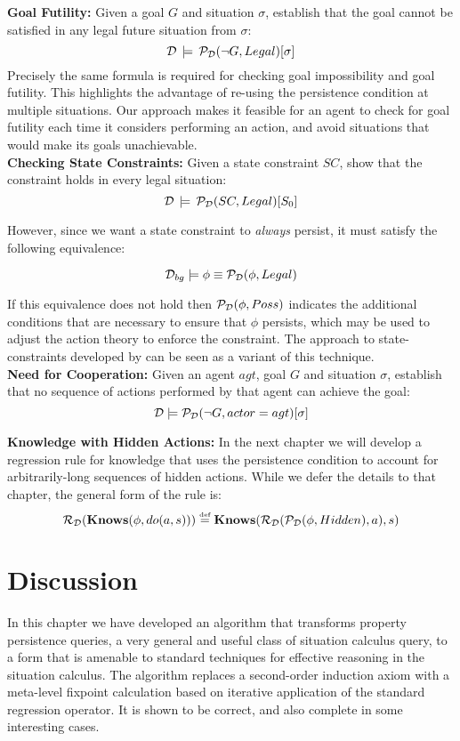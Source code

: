\textbf{Goal Futility:} Given a goal $G$ and situation $\sigma$,
establish that the goal cannot be satisfied in any legal future situation
from $\sigma$:\[
\mathcal{D}\,\models\,\mathcal{P}_{\mathcal{D}}(\neg G,Legal)[\sigma]\]
 Precisely the same formula is required for checking goal impossibility
and goal futility. This highlights the advantage of re-using the persistence
condition at multiple situations. Our approach makes it feasible for
an agent to check for goal futility each time it considers performing
an action, and avoid situations that would make its goals unachievable.\\


\textbf{Checking State Constraints:} Given a state constraint $SC$,
show that the constraint holds in every legal situation:\[
\mathcal{D}\,\models\,\mathcal{P}_{\mathcal{D}}(SC,Legal)[S_{0}]\]


However, since we want a state constraint to \emph{always} persist,
it must satisfy the following equivalence:

\[
\mathcal{D}_{bg}\models\phi\equiv\mathcal{P}_{\mathcal{D}}(\phi,Legal)\]


If this equivalence does not hold then $\mathcal{P}_{\mathcal{D}}(\phi,Poss)$ indicates
the additional conditions that are necessary to ensure that $\phi$
persists, which may be used to adjust the action theory to enforce
the constraint. The approach to state-constraints developed by \citet{Lin94-StateConstraints}
can be seen as a variant of this technique.\\


\textbf{Need for Cooperation:} Given an agent $agt$, goal $G$ and
situation $\sigma$, establish that no sequence of actions performed
by that agent can achieve the goal:\[
\mathcal{D}\models\mathcal{P}_{\mathcal{D}}(\neg G,actor=agt)[\sigma]\]


\textbf{Knowledge with Hidden Actions:} In the next chapter we will
develop a regression rule for knowledge that uses the persistence
condition to account for arbitrarily-long sequences of hidden actions.
While we defer the details to that chapter, the general form of the
rule is:\[
\mathcal{R}_{\mathcal{D}}(\mathbf{Knows}(\phi,do(a,s)))\stackrel{\mbox{\tiny def}}{=}\mathbf{Knows}(\mathcal{R}_{\mathcal{D}}(\mathcal{P}_{\mathcal{D}}(\phi,Hidden),a),s)\]



\section{Discussion\label{sec:Persistence:Discussion}}

In this chapter we have developed an algorithm that transforms property
persistence queries, a very general and useful class of situation
calculus query, to a form that is amenable to standard techniques
for effective reasoning in the situation calculus. The algorithm replaces
a second-order induction axiom with a meta-level fixpoint calculation
based on iterative application of the standard regression operator.
It is shown to be correct, and also complete in some interesting cases.

